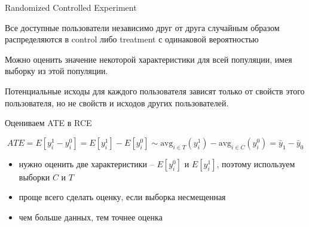 \documentclass[11pt,aspectratio=169]{beamer}
\begin{document}
\begin{frame}{Randomized Controlled Experiment}

\begin{tcolorbox}[colback=info!5,colframe=info!80,title=Схема эксперимента]
Все доступные пользователи независимо друг от друга случайным образом распределяются в control либо treatment с одинаковой вероятностью
\end{tcolorbox}

\end{frame}

\begin{frame}{\phantom{Предположения RCE}}

\begin{tcolorbox}[colback=warn!5,colframe=warn!80,title=Предположение 1: ]
Можно оценить значение некоторой характеристики для всей популяции, имея выборку из этой популяции.
\end{tcolorbox}

\vfill

\begin{tcolorbox}[colback=warn!5,colframe=warn!80,title=Предположение 2: Stable Unit Treatment Value Assumption]
Потенциальные исходы для каждого пользователя зависят только от свойств этого пользователя, но не свойств и исходов других пользователей.
\end{tcolorbox}

\end{frame}

\begin{frame}{Оцениваем ATE в RCE}

\[
ATE = E[y_i^1 - y_i^0] = E[y_i^1] - E[y_i^0] \sim \text{avg}_{i \in T}(y_i^1) - \text{avg}_{i \in C}(y_i^0) = \bar y_1 - \bar y_0
\]

\begin{itemize}
\item нужно оценить две характеристики -- $E[y_i^0]$ и $E[y_i^1]$, поэтому используем выборки $C$ и $T$
\item проще всего сделать оценку, если выборка несмещенная
\item чем больше данных, тем точнее оценка
\end{itemize}

\end{frame}
\end{document}
